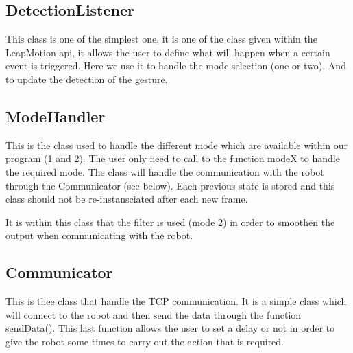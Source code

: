 \subsection{DetectionListener}

This class is one of the simplest one, it is one of the class given within the LeapMotion api, it allows the user to define what will happen when a certain event is triggered.
Here we use it to handle the mode selection (one or two). And to update the detection of the gesture.

\subsection{ModeHandler}

This is the class used to handle the different mode which are available within our program (1 and 2). The user only need to call to the function modeX to handle the required mode. The class will handle the communication with the robot through the Communicator (see below). Each previous state is stored and this class should not be re-instansciated after each new frame.

It is within this class that the filter is used (mode 2) in order to smoothen the output when communicating with the robot.

\subsection{Communicator}

This is thee class that handle the TCP communication. It is a simple class which will connect to the robot and then send the data through the function sendData(). This last function allows the user to set a delay or not in order to give the robot some times to carry out the action that is required.
